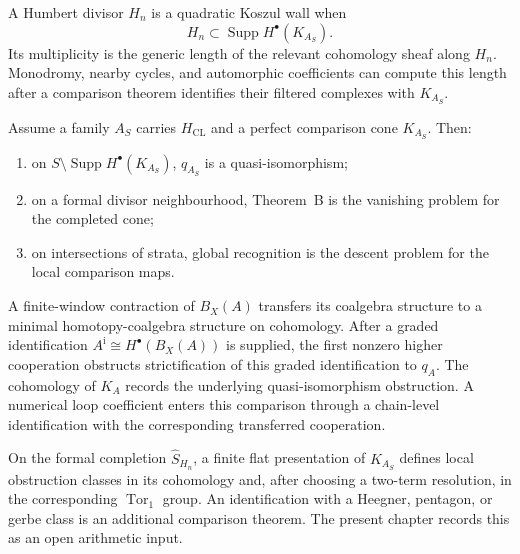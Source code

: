 \begin{remark}
\label{rem:tbsp-3}
A Humbert divisor \(H_n\) is a quadratic Koszul wall when
\[
 H_n\subset
 \operatorname{Supp}H^\bullet(K_{A_S}).
\]
Its multiplicity is the generic length of the relevant cohomology
sheaf along \(H_n\).  Monodromy, nearby cycles, and automorphic
coefficients can compute this length after a comparison theorem
identifies their filtered complexes with \(K_{A_S}\).
\end{remark}

\begin{corollary}
\label{cor:tbsp-trichotomy-HDelta5}
Assume a family \(A_S\) carries \(H_{\mathrm{CL}}\) and a perfect
comparison cone \(K_{A_S}\).  Then:
\begin{enumerate}[label=\textup{(\roman*)}]
\item on \(S\setminus\operatorname{Supp}H^\bullet(K_{A_S})\),
 \(q_{A_S}\) is a quasi-isomorphism;
\item on a formal divisor neighbourhood, Theorem~B is the vanishing
 problem for the completed cone;
\item on intersections of strata, global recognition is the descent
 problem for the local comparison maps.
\end{enumerate}
\end{corollary}

\begin{remark}
\label{rem:tbsp-4}
A finite-window contraction of \(B_X(A)\) transfers its coalgebra
structure to a minimal homotopy-coalgebra structure on cohomology.
After a graded identification
\(A^{\mathrm i}\cong H^\bullet(B_X(A))\) is supplied, the first
nonzero higher cooperation obstructs strictification of this graded
identification to \(q_A\).  The cohomology of \(K_A\) records the
underlying quasi-isomorphism obstruction.  A numerical loop
coefficient enters this comparison through a chain-level
identification with the corresponding transferred cooperation.
\end{remark}

\begin{remark}
\label{rem:tbsp-5-tor-class}
On the formal completion \(\widehat S_{H_n}\), a finite flat
presentation of \(K_{A_S}\) defines local obstruction classes in its
cohomology and, after choosing a two-term resolution, in the
corresponding \(\operatorname{Tor}_1\) group.  An identification with
a Heegner, pentagon, or gerbe class is an additional comparison
theorem.  The present chapter records this as an open arithmetic
input.
\end{remark}

